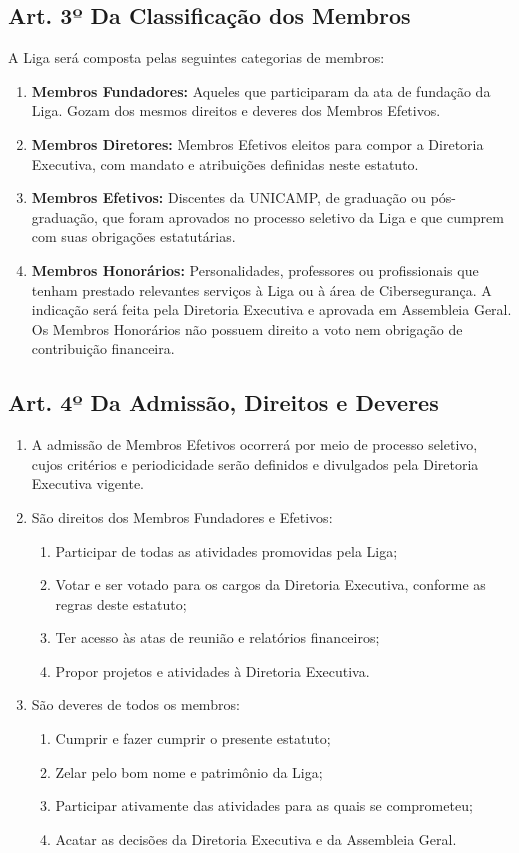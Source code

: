 \documentclass[12pt, a4paper]{article}
\begin{document}
\subsection{Art. 3º Da Classificação dos Membros}
A Liga será composta pelas seguintes categorias de membros:
\begin{enumerate}[label=\alph*)]
    \item \textbf{Membros Fundadores:} Aqueles que participaram da ata de fundação da Liga. Gozam dos mesmos direitos e deveres dos Membros Efetivos.
    \item \textbf{Membros Diretores:} Membros Efetivos eleitos para compor a Diretoria Executiva, com mandato e atribuições definidas neste estatuto.
    \item \textbf{Membros Efetivos:} Discentes da UNICAMP, de graduação ou pós-graduação, que foram aprovados no processo seletivo da Liga e que cumprem com suas obrigações estatutárias.
    \item \textbf{Membros Honorários:} Personalidades, professores ou profissionais que tenham prestado relevantes serviços à Liga ou à área de Cibersegurança. A indicação será feita pela Diretoria Executiva e aprovada em Assembleia Geral. Os Membros Honorários não possuem direito a voto nem obrigação de contribuição financeira.
\end{enumerate}

\subsection{Art. 4º Da Admissão, Direitos e Deveres}
\begin{enumerate}[label=\S \arabic*.]
    \item A admissão de Membros Efetivos ocorrerá por meio de processo seletivo, cujos critérios e periodicidade serão definidos e divulgados pela Diretoria Executiva vigente.
    \item São direitos dos Membros Fundadores e Efetivos:
    \begin{enumerate}[label=\alph*)]
        \item Participar de todas as atividades promovidas pela Liga;
        \item Votar e ser votado para os cargos da Diretoria Executiva, conforme as regras deste estatuto;
        \item Ter acesso às atas de reunião e relatórios financeiros;
        \item Propor projetos e atividades à Diretoria Executiva.
    \end{enumerate}
    \item São deveres de todos os membros:
    \begin{enumerate}[label=\alph*)]
        \item Cumprir e fazer cumprir o presente estatuto;
        \item Zelar pelo bom nome e patrimônio da Liga;
        \item Participar ativamente das atividades para as quais se comprometeu;
        \item Acatar as decisões da Diretoria Executiva e da Assembleia Geral.
    \end{enumerate}
\end{enumerate}
\end{document}
